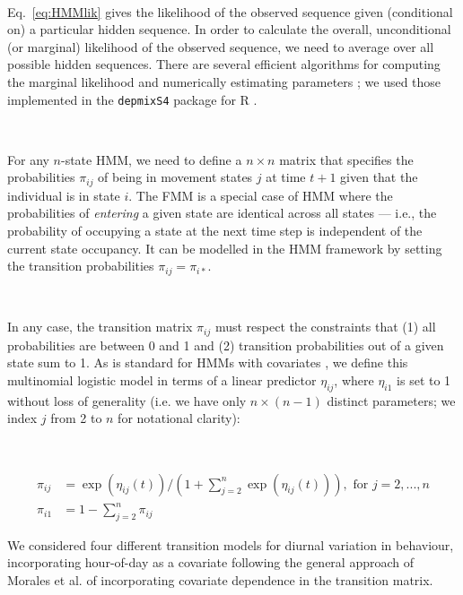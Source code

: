 \documentclass{bmcart}
\begin{document}
\

Eq.~\ref{eq:HMMlik} gives the likelihood of the observed sequence 
given (conditional on) a particular
hidden sequence. 
In order to calculate the overall, unconditional (or marginal) 
likelihood of the 
observed sequence, we need to average over all possible hidden sequences. 
There are several efficient algorithms for computing the marginal likelihood and
numerically estimating parameters \cite{zucchini_hidden_2009};
we used those implemented in the \texttt{depmixS4} package for R
\cite{visser2010depmixs4,R}.

\

For any $n$-state HMM, we need to define a $n \times n$ matrix that specifies the probabilities $\pi_{ij}$ of being in movement states $j$ at time $t+1$ given that the individual is in state $i$.  The FMM is a special case of HMM where the probabilities of \emph{entering} a given state are identical across all states --- i.e., the probability of occupying a state at the next time step is independent of the current state occupancy. It can be modelled in the HMM framework by setting the transition probabilities  $\pi_{ij} = \pi_{i*}$.

\

In any case, the transition matrix $\pi_{ij}$ must respect the constraints that (1) all probabilities are between 0 and 1 and (2) transition probabilities out of a given state sum to 1.
As is standard for HMMs with covariates \cite{visser2010depmixs4}, we define this multinomial logistic model in terms of a linear predictor $\eta_{ij}$, where $\eta_{i1}$ is set to 1 without loss of generality (i.e. we have only $n \times (n-1)$ distinct parameters; we index $j$ from 2 to $n$ for notational clarity):

\

\begin{equation}
\begin{split}
\pi_{ij} & = \exp(\eta_{ij}(t))/\left(1+\sum_{j=2}^{n}\exp(\eta_{ij}(t))\right), \textrm{ for } j={2,...,n} \\
\pi_{i1} & = 1 - \sum_{j=2}^{n}\pi_{ij}
\end{split}
\end{equation}

We considered four different transition models for diurnal variation in behaviour, incorporating hour-of-day as a covariate following the general approach of Morales et al.\cite{morales_extracting_2004} of incorporating covariate dependence in the transition matrix.
\end{document}

